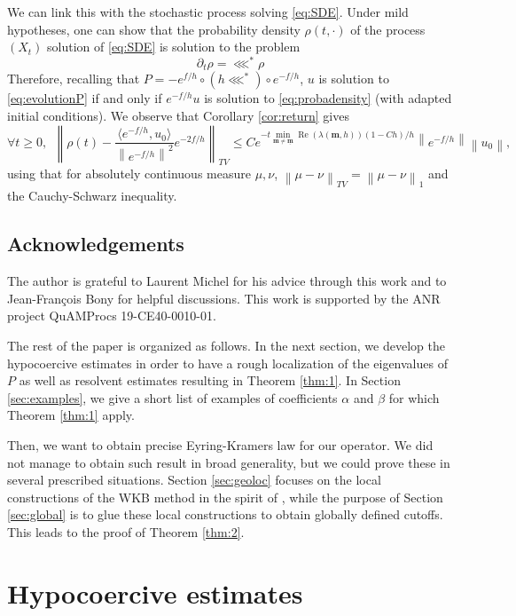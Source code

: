 \documentclass[12pt]{amsart}
\renewcommand{\Re}{\operatorname{Re}}
\def\<{\langle}
\def\>{\rangle}
\numberwithin{equation}{section}
\numberwithin{figure}{section}
\def\m{\mathbf{m}}
\def\um{\underline{\m}}
\newcommand{\vvert}[1]{\left\lVert#1\right\rVert}
\begin{document}
We can link this with the stochastic process solving \eqref{eq:SDE}. Under mild hypotheses, one can show that the probability density $\rho(t,\cdot)$ of the process $(X_t)$ solution of \eqref{eq:SDE} is solution to the problem
\begin{equation}\label{eq:probadensity}
\partial_t \rho = \lll^*\rho
\end{equation}
Therefore, recalling that $P = -e^{f/h}\circ(h\lll^*)\circ e^{-f/h}$, $u$ is solution to \eqref{eq:evolutionP} if and only if $e^{-f/h}u$ is solution to \eqref{eq:probadensity} (with adapted initial conditions). We observe that Corollary \ref{cor:return} gives
\begin{equation*}
\forall t\geq 0,\ \ \vvert{\rho(t) - \frac{\<e^{-f/h},u_0\>}{\vvert{e^{-f/h}}^2}e^{-2f/h}}_{TV} \leq Ce^{-t\underset{\m\neq\um}{\min}\Re(\lambda(\m,h))(1-Ch)/h}\vvert{e^{-f/h}}\vvert{u_0},
\end{equation*}
using that for absolutely continuous measure $\mu,\nu$, $\vvert{\mu-\nu}_{TV} = \vvert{\mu-\nu}_1$ and the Cauchy-Schwarz inequality.



\subsection*{Acknowledgements}
The author is grateful to Laurent Michel for his advice through this work and to Jean-François Bony for helpful discussions. This work is supported by the ANR project QuAMProcs 19-CE40-0010-01.

The rest of the paper is organized as follows. In the next section, we develop the hypocoercive estimates in order to have a rough localization of the eigenvalues of $P$ as well as resolvent estimates resulting in Theorem \ref{thm:1}. In Section \ref{sec:examples}, we give a short list of examples of coefficients $\alpha$ and $\beta$ for which Theorem \ref{thm:1} apply.

Then, we want to obtain precise Eyring-Kramers law for our operator. We did not manage to obtain such result in broad generality, but we could prove these in several prescribed situations. Section \ref{sec:geoloc} focuses on the local constructions of the WKB method in the spirit of \cite{BoLePMi22}, while the purpose of Section \ref{sec:global} is to glue these local constructions to obtain globally defined cutoffs. This leads to the proof of Theorem \ref{thm:2}.



\section{Hypocoercive estimates}\label{sec:Hypocoer}
\end{document}
